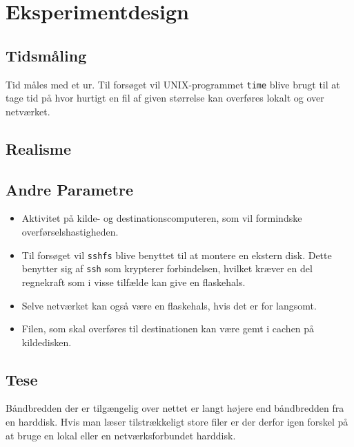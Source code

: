 \documentclass{article}
\author{Mikkel, Jannik, Rune \& Rasmus}
\date{\today}
\begin{document}
\section{Eksperimentdesign}

\subsection{Tidsmåling}
Tid måles med et ur. Til forsøget vil UNIX-programmet {\tt time} blive brugt til at tage tid på hvor hurtigt en fil af given størrelse kan overføres lokalt og over netværket.
\subsection{Realisme}


\subsection{Andre Parametre}

\begin{itemize}
	\item Aktivitet på kilde- og destinationscomputeren, som vil formindske overførselshastigheden.
	\item Til forsøget vil {\tt sshfs} blive benyttet til at montere en ekstern disk. Dette benytter sig af {\tt ssh} som krypterer forbindelsen, hvilket kræver en del regnekraft som i visse tilfælde kan give en flaskehals.
	\item Selve netværket kan også være en flaskehals, hvis det er for langsomt.
	\item Filen, som skal overføres til destinationen kan være gemt i cachen på kildedisken.
\end{itemize}

\subsection{Tese}
Båndbredden der er tilgængelig over nettet er langt højere end båndbredden fra en harddisk. Hvis man læser tilstrækkeligt store filer er der derfor igen forskel på at bruge en lokal eller en netværksforbundet harddisk.

\end{document}
